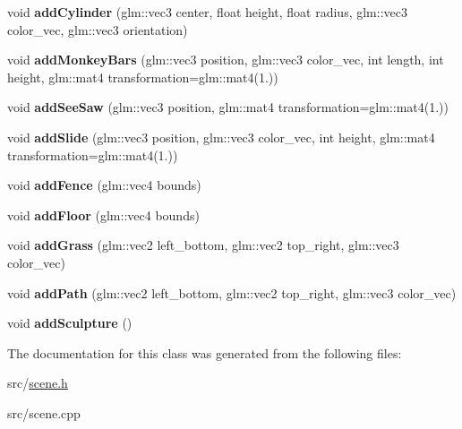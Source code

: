 \begin{DoxyCompactItemize}
\item 
void {\bfseries add\+Cylinder} (glm\+::vec3 center, float height, float radius, glm\+::vec3 color\+\_\+vec, glm\+::vec3 orientation)\hypertarget{classScene_a409b7a6c62864b577d18bfa0a21328b8}{}\label{classScene_a409b7a6c62864b577d18bfa0a21328b8}

\item 
void {\bfseries add\+Monkey\+Bars} (glm\+::vec3 position, glm\+::vec3 color\+\_\+vec, int length, int height, glm\+::mat4 transformation=glm\+::mat4(1.))\hypertarget{classScene_a675b27fd6d43d476ea72e24516e74e29}{}\label{classScene_a675b27fd6d43d476ea72e24516e74e29}

\item 
void {\bfseries add\+See\+Saw} (glm\+::vec3 position, glm\+::mat4 transformation=glm\+::mat4(1.))\hypertarget{classScene_a34b6ec965fa29f846960a8d0a1a29ab8}{}\label{classScene_a34b6ec965fa29f846960a8d0a1a29ab8}

\item 
void {\bfseries add\+Slide} (glm\+::vec3 position, glm\+::vec3 color\+\_\+vec, int height, glm\+::mat4 transformation=glm\+::mat4(1.))\hypertarget{classScene_a0f48f51679e3fa19186dd14882f4aaa4}{}\label{classScene_a0f48f51679e3fa19186dd14882f4aaa4}

\item 
void {\bfseries add\+Fence} (glm\+::vec4 bounds)\hypertarget{classScene_acdf5c0ffe3705f348bde81588cba0772}{}\label{classScene_acdf5c0ffe3705f348bde81588cba0772}

\item 
void {\bfseries add\+Floor} (glm\+::vec4 bounds)\hypertarget{classScene_a3f3d563d0a651e912f478d7f3205ea43}{}\label{classScene_a3f3d563d0a651e912f478d7f3205ea43}

\item 
void {\bfseries add\+Grass} (glm\+::vec2 left\+\_\+bottom, glm\+::vec2 top\+\_\+right, glm\+::vec3 color\+\_\+vec)\hypertarget{classScene_ad12ad7ae32e254ec1c5e8e5e62be3c60}{}\label{classScene_ad12ad7ae32e254ec1c5e8e5e62be3c60}

\item 
void {\bfseries add\+Path} (glm\+::vec2 left\+\_\+bottom, glm\+::vec2 top\+\_\+right, glm\+::vec3 color\+\_\+vec)\hypertarget{classScene_a6bd399270b6bdf6743a740bf3adf0faf}{}\label{classScene_a6bd399270b6bdf6743a740bf3adf0faf}

\item 
void {\bfseries add\+Sculpture} ()\hypertarget{classScene_a6ebf6ab55c8a302bd82d89761acec3b2}{}\label{classScene_a6ebf6ab55c8a302bd82d89761acec3b2}

\end{DoxyCompactItemize}


The documentation for this class was generated from the following files\+:\begin{DoxyCompactItemize}
\item 
src/\hyperlink{scene_8h}{scene.\+h}\item 
src/scene.\+cpp\end{DoxyCompactItemize}
